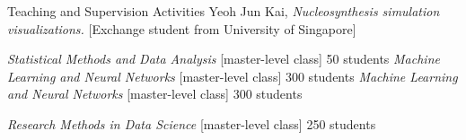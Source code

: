 \begin{rubric}{Teaching and Supervision Activities}
\entry*[2018]%
Yeoh Jun Kai,
\emph{Nucleosynthesis simulation visualizations.}
[Exchange student from University of Singapore]
%

%
%
\entry*[2023-2024, Sem A]%
\emph{Statistical Methods and Data Analysis}
[master-level class] 50 students
%
\entry*[2023-2024, Sem A]%
\emph{Machine Learning and Neural Networks} [master-level class] 300 students
%
\entry*[2024, Sem B]%
\emph{Machine Learning and Neural Networks} [master-level class] 300 students

\entry*[2023, Sem C]%
\emph{Research Methods in Data Science} [master-level class] 250 students

\end{rubric}